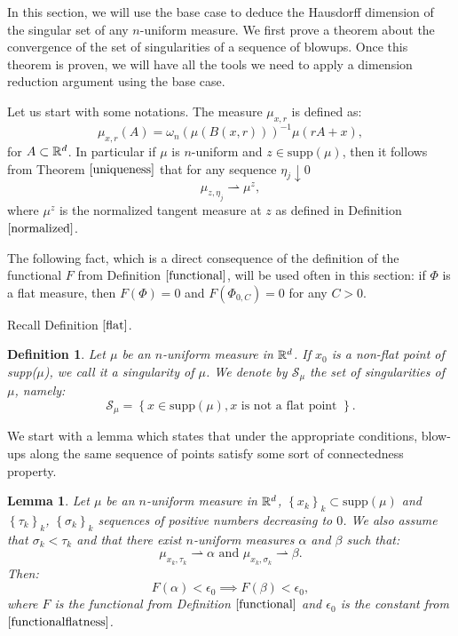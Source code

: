 \documentclass[11pt]{article}
\newtheorem{lemma}[theorem]{Lemma}
\newtheorem{definition}[theorem]{Definition}
\theoremstyle{definition}
\theoremstyle{remark}
\numberwithin{equation}{section}
\begin{document}
In this section, we will use the base case to deduce the Hausdorff dimension of the singular set of any $n$-uniform measure. We first prove a theorem about the convergence of the set of singularities of a sequence of blowups. 
Once this theorem is proven, we will have all the tools we need to apply a dimension reduction argument using the base case.

Let us start with some notations.
The measure $\mu_{x ,r}$ is defined as:
\begin{equation}
\mu_{x ,r}(A)= \omega_{n} (\mu(B(x ,r)))^{-1} \mu(r A+x),
\end{equation}
for $A \subset \mathbb{R}^{d}$.
In particular if $\mu$ is $n$-uniform and $z \in \mbox{supp}(\mu)$, then it follows from Theorem $\ref{uniqueness}$ that  for any sequence $\eta_j \downarrow 0$  
\begin{equation}
\mu_{z , \eta_{j}} \rightharpoonup \mu^{z},
\end{equation}
where $\mu^{z}$ is the normalized tangent measure at $z$ as defined in Definition $\ref{normalized}$.

The following fact, which is a direct consequence of the definition of the functional $F$ from Definition $\ref{functional}$, will be used often in this section: if $\Phi$ is a flat measure, then $F(\Phi)=0$ and $F(\Phi_{0,C})=0$ for any $C>0$.

Recall Definition $\ref{flat}$.
\begin{definition}
Let $\mu$ be an $n$-uniform measure in $\mathbb{R}^{d}$.
If $x_0$ is a non-flat point of \mbox{supp}($\mu$), we call it a singularity of $\mu$.
We denote by $\mathcal{S}_{\mu}$ the set of singularities of $\mu$, namely:
$$\mathcal{S}_{\mu}= \left\lbrace x \in \mbox{supp}(\mu), x \mbox{ is not a flat point } \right\rbrace.$$
\end{definition}
We start with a lemma which states that under the appropriate conditions, blow-ups along the same sequence of points satisfy some sort of connectedness property. 
\begin{lemma}\label{connectednessblowups}
Let $\mu$ be an $n$-uniform measure in $\mathbb{R}^{d}$, $\left\lbrace x_k \right\rbrace_{k} \subset \mbox{supp}(\mu)$ and $\left\lbrace \tau_{k} \right\rbrace_k$, $\left\lbrace \sigma_{k} \right\rbrace_{k}$ sequences of positive numbers decreasing to $0$.
We also assume that $\sigma_k < \tau_k$ and that there exist $n$-uniform measures $\alpha$ and $\beta$ such that:
$$\mu_{x_k,\tau_k} \rightharpoonup \alpha \mbox{ and } \mu_{x_k,\sigma_k} \rightharpoonup \beta.$$
Then:
$$F(\alpha) < \epsilon_{0} \implies F(\beta) < \epsilon_{0},$$
where $F$ is the functional from Definition $\ref{functional}$ and $\epsilon_0$ is the constant from $\ref{functionalflatness} $. \end{lemma}
\end{document}

